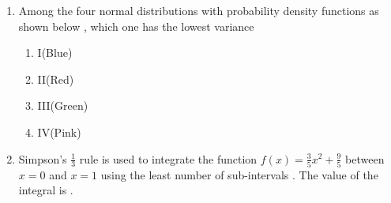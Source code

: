 \documentclass[journal]{IEEEtran}
\begin{document}
\begin{enumerate}
  \item Among the four normal distributions with probability density functions as shown below , which one has the lowest variance
  
   \hfill{}
  
\begin{enumerate}
    \item I(Blue)
    \item II(Red)
    \item III(Green)
    \item IV(Pink)
\end{enumerate}

\item Simpson's $\frac{1}{3}$ rule is used to integrate the function $f(x)=\frac{3}{5}x^2+\frac{9}{5}$ between $x=0$ and $x=1$ using the least number of sub-intervals . The value of the integral is .
 \hfill{}




\end{enumerate}
\end{document}
